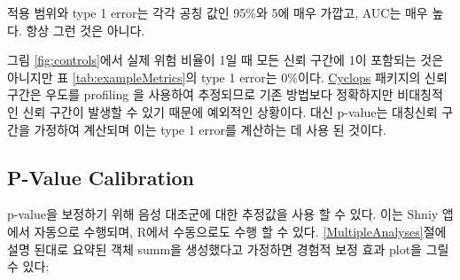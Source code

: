 \documentclass[11pt]{book}
\newenvironment{Shaded}{\begin{snugshade}}{\end{snugshade}}
\newcommand{\KeywordTok}[1]{\textcolor[rgb]{0.13,0.29,0.53}{\textbf{#1}}}
\newcommand{\DataTypeTok}[1]{\textcolor[rgb]{0.13,0.29,0.53}{#1}}
\newcommand{\StringTok}[1]{\textcolor[rgb]{0.31,0.60,0.02}{#1}}
\newcommand{\CommentTok}[1]{\textcolor[rgb]{0.56,0.35,0.01}{\textit{#1}}}
\newcommand{\OtherTok}[1]{\textcolor[rgb]{0.56,0.35,0.01}{#1}}
\newcommand{\OperatorTok}[1]{\textcolor[rgb]{0.81,0.36,0.00}{\textbf{#1}}}
\newcommand{\NormalTok}[1]{#1}
\theoremstyle{definition}
\theoremstyle{definition}
\theoremstyle{definition}
\theoremstyle{remark}
\begin{document}
적용 범위와 type 1 error는 각각 공칭 값인 95\%와 5에 매우 가깝고, AUC는
매우 높다. 항상 그런 것은 아니다.

그림 \ref{fig:controls}에서 실제 위험 비율이 1일 때 모든 신뢰 구간에 1이
포함되는 것은 아니지만 표 \ref{tab:exampleMetrics}의 type 1 error는
0\%이다. \href{https://ohdsi.github.io/Cyclops/}{Cyclops} 패키지의 신뢰
구간은 우도를 profiling 을 사용하여 추정되므로 기존 방법보다 정확하지만
비대칭적인 신뢰 구간이 발생할 수 있기 때문에 예외적인 상황이다. 대신
p-value는 대칭신뢰 구간을 가정하여 계산되며 이는 type 1 error를 계산하는
데 사용 된 것이다.

\subsection{P-Value Calibration}\label{p-value-calibration-1}

p-value을 보정하기 위해 음성 대조군에 대한 추정값을 사용 할 수 있다.
이는 Shniy 앱에서 자동으로 수행되며, R에서 수동으로도 수행 할 수 있다.
\ref{MultipleAnalyses}절에 설명 된대로 요약된 객체 summ을 생성했다고
가정하면 경험적 보정 효과 plot을 그릴 수 있다:

\begin{Shaded}
\end{Shaded}
\end{document}
